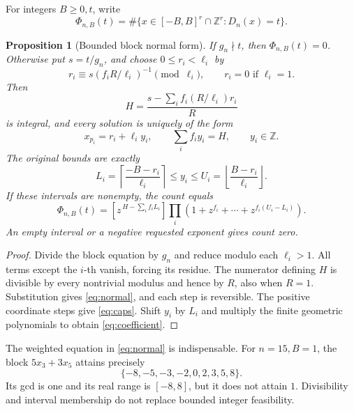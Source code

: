\documentclass[11pt,a4paper]{article}
\newtheorem{proposition}[theorem]{Proposition}
\theoremstyle{definition}\newtheorem{question}[theorem]{Question}
\theoremstyle{remark}\newtheorem{remark}[theorem]{Remark}
\newcommand{\Z}{\mathbb Z}\newcommand{\R}{\mathbb R}
\begin{document}
For integers \(B\ge0,t\), write
\[
 \Phi_{n,B}(t)=\#\{x\in[-B,B]^r\cap\Z^r:D_n(x)=t\}.
\]
\begin{proposition}[Bounded block normal form]\label{prop:normal}
If \(g_n\nmid t\), then \(\Phi_{n,B}(t)=0\). Otherwise put \(s=t/g_n\),
and choose \(0\le r_i<\ell_i\) by
\[
 r_i\equiv s(f_iR/\ell_i)^{-1}\pmod{\ell_i},
 \qquad r_i=0\text{ if }\ell_i=1.
\]
Then
\[
 H=\frac{s-\sum_i f_i(R/\ell_i)r_i}{R}
\]
is integral, and every solution is uniquely of the form
\begin{equation}\label{eq:normal}
 x_{p_i}=r_i+\ell_i y_i,\qquad
 \sum_i f_i y_i=H,\qquad y_i\in\Z.
\end{equation}
The original bounds are exactly
\begin{equation}\label{eq:caps}
 L_i=\left\lceil\frac{-B-r_i}{\ell_i}\right\rceil
 \le y_i\le
 U_i=\left\lfloor\frac{B-r_i}{\ell_i}\right\rfloor.
\end{equation}
If these intervals are nonempty, the count equals
\begin{equation}\label{eq:coefficient}
 \Phi_{n,B}(t)=
 [z^{\,H-\sum_i f_iL_i}]
 \prod_i\left(1+z^{f_i}+\cdots+z^{f_i(U_i-L_i)}\right).
\end{equation}
An empty interval or a negative requested exponent gives count zero.
\end{proposition}
\begin{proof}
Divide the block equation by \(g_n\) and reduce modulo each
\(\ell_i>1\). All terms except the \(i\)-th vanish, forcing its residue.
The numerator defining \(H\) is divisible by every nontrivial modulus
and hence by \(R\), also when \(R=1\).
Substitution gives \eqref{eq:normal}, and each step is reversible.
The positive coordinate steps give \eqref{eq:caps}. Shift \(y_i\) by
\(L_i\) and multiply the finite geometric polynomials to obtain
\eqref{eq:coefficient}.
\end{proof}

The weighted equation in \eqref{eq:normal} is indispensable. For
\(n=15,B=1\), the block \(5x_3+3x_5\) attains precisely
\[
 \{-8,-5,-3,-2,0,2,3,5,8\}.
\]
Its gcd is one and its real range is \([-8,8]\), but it does not attain
\(1\). Divisibility and interval membership do not replace bounded
integer feasibility.
\end{document}
